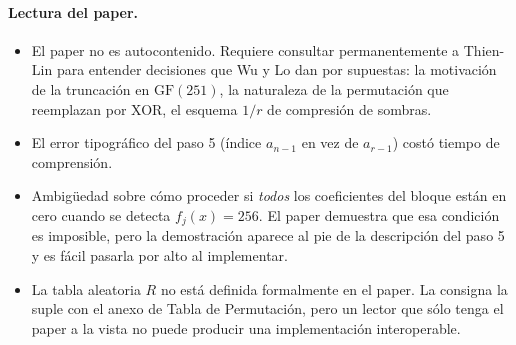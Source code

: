 \documentclass[11pt,a4paper]{article}
\begin{document}
\paragraph{Lectura del paper.}
\begin{itemize}[leftmargin=*,nosep]
    \item El paper no es autocontenido. Requiere consultar
          permanentemente a Thien-Lin \cite{thien2002} para entender
          decisiones que Wu y Lo dan por supuestas: la motivación de la
          truncación en $\mathrm{GF}(251)$, la naturaleza de la
          permutación que reemplazan por XOR, el esquema $1/r$ de
          compresión de sombras.
    \item El error tipográfico del paso 5 (índice $a_{n-1}$ en vez de
          $a_{r-1}$) costó tiempo de comprensión.
    \item Ambigüedad sobre cómo proceder si \emph{todos} los coeficientes
          del bloque están en cero cuando se detecta $f_j(x)=256$. El
          paper demuestra que esa condición es imposible, pero la
          demostración aparece al pie de la descripción del paso 5 y es
          fácil pasarla por alto al implementar.
    \item La tabla aleatoria $R$ no está definida formalmente en el
          paper. La consigna la suple con el anexo de Tabla de
          Permutación, pero un lector que sólo tenga el paper a la
          vista no puede producir una implementación interoperable.
\end{itemize}
\end{document}
